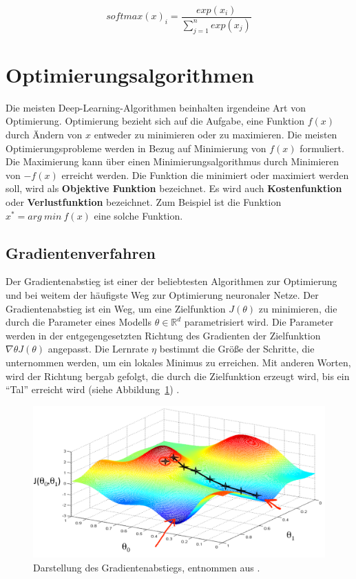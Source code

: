 \begin{equation} 
    softmax( x)_{i} =\frac{exp( x_{i})}{\sum ^{n}_{j=1} exp( x_{j})}
\end{equation}
\label{FormelSoft}

\section{Optimierungsalgorithmen}
Die meisten Deep-Learning-Algorithmen beinhalten irgendeine Art von Optimierung. Optimierung bezieht sich auf die Aufgabe, eine Funktion $f(x)$ durch Ändern von $x$ entweder zu minimieren oder zu maximieren. Die meisten Optimierungsprobleme werden in Bezug auf Minimierung von $f(x)$ formuliert. Die Maximierung kann über einen Minimierungsalgorithmus durch Minimieren von $-$$f(x)$ erreicht werden. Die Funktion die minimiert oder maximiert werden soll, wird als \textbf{Objektive Funktion} bezeichnet. Es wird auch \textbf{Kostenfunktion} oder \textbf{Verlustfunktion} bezeichnet. Zum Beispiel ist die Funktion $x^{*} = arg\ min\ f( x)$ eine solche Funktion.

        \subsection{Gradientenverfahren}
        Der Gradientenabstieg ist einer der beliebtesten Algorithmen zur Optimierung und bei weitem der häufigste Weg zur Optimierung neuronaler Netze. Der Gradientenabstieg ist ein Weg, um eine Zielfunktion $J(\theta)$ zu minimieren, die durch die Parameter eines Modells $\theta \in \mathbb{R}^{d}$ parametrisiert wird. Die Parameter werden in der entgegengesetzten Richtung des Gradienten der Zielfunktion $\nabla \theta J (\theta)$ angepasst. Die Lernrate $\eta$ bestimmt die Größe der Schritte, die unternommen werden, um ein lokales Minimus zu erreichen. Mit anderen Worten, wird der Richtung bergab gefolgt, die durch die Zielfunktion erzeugt wird, bis ein \enquote{Tal} erreicht wird (siehe Abbildung~\ref{Kap2:Grad}) \cite*{Ruder2016}.



        \begin{figure}[H]
            \centering
            \includegraphics[width=12cm]{kapitel2/gradient.png}
            \caption[Der Gradientenabstieg]{Darstellung des Gradientenabstiegs, entnommen aus \cite*{hackernoon}.}
            \label{Kap2:Grad}
        \end{figure}



